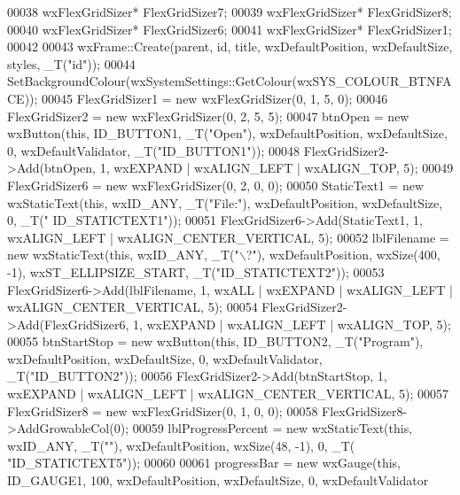 \begin{DoxyCode}
00038     wxFlexGridSizer* FlexGridSizer7;
00039     wxFlexGridSizer* FlexGridSizer8;
00040     wxFlexGridSizer* FlexGridSizer6;
00041     wxFlexGridSizer* FlexGridSizer1;
00042 
00043     wxFrame::Create(parent, \textcolor{keywordtype}{id}, title, wxDefaultPosition, wxDefaultSize, styles, \_T(\textcolor{stringliteral}{"id"}));
00044     SetBackgroundColour(wxSystemSettings::GetColour(wxSYS\_COLOUR\_BTNFACE));
00045     FlexGridSizer1 = \textcolor{keyword}{new} wxFlexGridSizer(0, 1, 5, 0);
00046     FlexGridSizer2 = \textcolor{keyword}{new} wxFlexGridSizer(0, 2, 5, 5);
00047     btnOpen = \textcolor{keyword}{new} wxButton(\textcolor{keyword}{this}, ID\_BUTTON1, \_T(\textcolor{stringliteral}{"Open"}), wxDefaultPosition, wxDefaultSize, 0, 
      wxDefaultValidator, \_T(\textcolor{stringliteral}{"ID\_BUTTON1"}));
00048     FlexGridSizer2->Add(btnOpen, 1, wxEXPAND | wxALIGN\_LEFT | wxALIGN\_TOP, 5);
00049     FlexGridSizer6 = \textcolor{keyword}{new} wxFlexGridSizer(0, 2, 0, 0);
00050     StaticText1 = \textcolor{keyword}{new} wxStaticText(\textcolor{keyword}{this}, wxID\_ANY, \_T(\textcolor{stringliteral}{"File:"}), wxDefaultPosition, wxDefaultSize, 0, \_T(\textcolor{stringliteral}{"
      ID\_STATICTEXT1"}));
00051     FlexGridSizer6->Add(StaticText1, 1, wxALIGN\_LEFT | wxALIGN\_CENTER\_VERTICAL, 5);
00052     lblFilename = \textcolor{keyword}{new} wxStaticText(\textcolor{keyword}{this}, wxID\_ANY, \_T(\textcolor{stringliteral}{"\(\backslash\)?"}), wxDefaultPosition, wxSize(400, -1), 
      wxST\_ELLIPSIZE\_START, \_T(\textcolor{stringliteral}{"ID\_STATICTEXT2"}));
00053     FlexGridSizer6->Add(lblFilename, 1, wxALL | wxEXPAND | wxALIGN\_LEFT | wxALIGN\_CENTER\_VERTICAL, 5);
00054     FlexGridSizer2->Add(FlexGridSizer6, 1, wxEXPAND | wxALIGN\_LEFT | wxALIGN\_TOP, 5);
00055     btnStartStop = \textcolor{keyword}{new} wxButton(\textcolor{keyword}{this}, ID\_BUTTON2, \_T(\textcolor{stringliteral}{"Program"}), wxDefaultPosition, wxDefaultSize, 0, 
      wxDefaultValidator, \_T(\textcolor{stringliteral}{"ID\_BUTTON2"}));
00056     FlexGridSizer2->Add(btnStartStop, 1, wxEXPAND | wxALIGN\_LEFT | wxALIGN\_CENTER\_VERTICAL, 5);
00057     FlexGridSizer8 = \textcolor{keyword}{new} wxFlexGridSizer(0, 1, 0, 0);
00058     FlexGridSizer8->AddGrowableCol(0);
00059     lblProgressPercent = \textcolor{keyword}{new} wxStaticText(\textcolor{keyword}{this}, wxID\_ANY, \_T(\textcolor{stringliteral}{""}), wxDefaultPosition, wxSize(48, -1), 0, \_T(\textcolor{stringliteral}{
      "ID\_STATICTEXT5"}));
00060 
00061     progressBar = \textcolor{keyword}{new} wxGauge(\textcolor{keyword}{this}, ID\_GAUGE1, 100, wxDefaultPosition, wxDefaultSize, 0, wxDefaultValidator

\end{DoxyCode}
